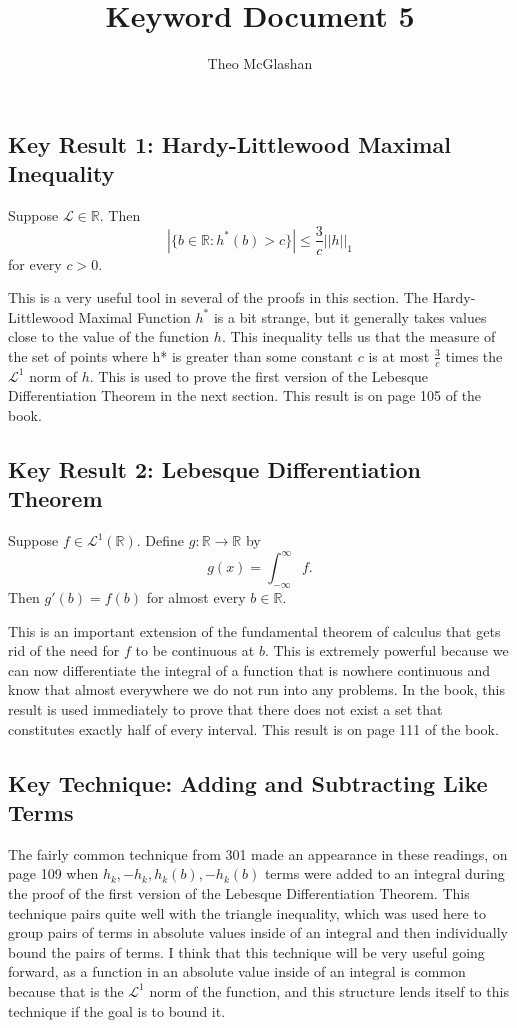 \documentclass[12pt]{article}
\title{Keyword Document 5}
\author{Theo McGlashan}
\date{}
\newcommand{\R}{\mathbb{R}}
\newcommand{\eq}[1]{\begin{equation*}#1\end{equation*}}
\begin{document}
\maketitle

\subsection*{Key Result 1: Hardy-Littlewood Maximal Inequality}

Suppose $\mathcal{L} \in \R$. Then \eq{|\{b \in \R : h^*(b) > c\}| \leq \frac{3}{c} ||h||_1} for every $c > 0$.

This is a very useful tool in several of the proofs in this section. The Hardy-Littlewood Maximal Function $h^*$ is a bit strange, but it generally takes values close to the value of the function $h$. This inequality tells us that the measure of the set of points where h* is greater than some constant $c$ is at most $\frac{3}{c}$ times the $\mathcal{L}^1$ norm of $h$. This is used to prove the first version of the Lebesque Differentiation Theorem in the next section. This result is on page 105 of the book.

\subsection*{Key Result 2: Lebesque Differentiation Theorem}

Suppose $f \in \mathcal{L}^1(\R)$. Define $g : \R \to \R$ by \eq{g(x) = \int_{-\infty}^{\infty} f.} Then $g'(b) = f(b)$ for almost every $b \in \R$.

This is an important extension of the fundamental theorem of calculus that gets rid of the need for $f$ to be continuous at $b$. This is extremely powerful because we can now differentiate the integral of a function that is nowhere continuous and know that almost everywhere we do not run into any problems. In the book, this result is used immediately to prove that there does not exist a set that constitutes exactly half of every interval. This result is on page 111 of the book.

\subsection*{Key Technique: Adding and Subtracting Like Terms}

The fairly common technique from 301 made an appearance in these readings, on page 109 when $h_k, -h_k, h_k(b), -h_k(b)$ terms were added to an integral during the proof of the first version of the Lebesque Differentiation Theorem. This technique pairs quite well with the triangle inequality, which was used here to group pairs of terms in absolute values inside of an integral and then individually bound the pairs of terms. I think that this technique will be very useful going forward, as a function in an absolute value inside of an integral is common because that is the $\mathcal{L}^1$ norm of the function, and this structure lends itself to this technique if the goal is to bound it.
\end{document}
